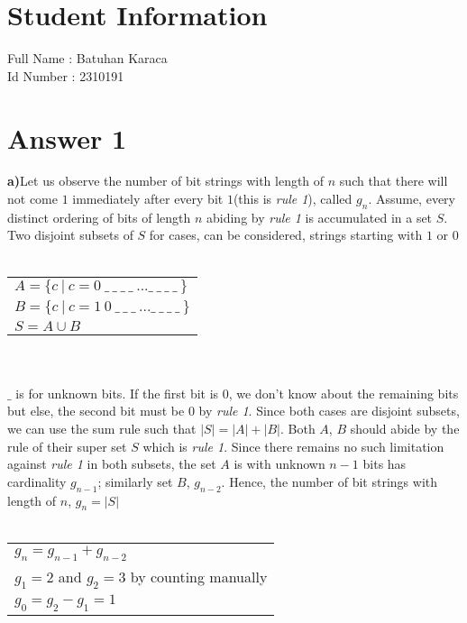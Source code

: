 \documentclass[12pt]{article}
\begin{document}
\section*{Student Information } 
Full Name : Batuhan Karaca \\
Id Number : 2310191 \\

\section*{Answer 1}
\textbf{a)}Let us observe the number of bit strings with length of $n$ such that there will not come $1$ 
immediately after every bit $1$(this is \textit{rule 1}), called $g_n$. Assume, every distinct 
ordering of bits of length $n$ abiding by \textit{rule 1} is accumulated in a set $S$.
Two disjoint subsets of $S$ for cases, can be considered, strings starting with $1$ or $0$
\\ \\
\begin{tabular}{l}
    $A=\{c\ |\ c=0\ \_\ \_\ \_\ \_\ ...\_\ \_\ \_\ \_\ \} $\\
    $B=\{c\ |\ c=1\ 0\ \_\ \_\ \_\ ...\_\ \_\ \_\ \_\ \} $\\
    $S=A\cup B$\\
\end{tabular}
\\ \\
$\_$ is for unknown bits.
If the first bit is $0$, we don't know about the remaining bits but else, the second bit must be $0$ by \textit{rule 1}.
Since both cases are disjoint subsets, we can use the sum rule such that $|S|=|A|+|B|$.
Both $A$, $B$ should abide by the rule of their super set $S$ which is \textit{rule 1}. Since there remains no such 
limitation against \textit{rule 1} in both subsets, 
the set $A$ is with unknown $n-1$ bits has cardinality $g_{n-1}$; similarly set $B$, $g_{n-2}$.
Hence, the number of bit strings with length of $n$, $g_n=|S|$
\\ \\
\begin{tabular}{l}
    $g_n=g_{n-1} + g_{n-2}$\\
    $g_1=2$ and $g_2=3$ by counting manually\\
    $g_0=g_2-g_1=1$\\
\end{tabular} 
\end{document}

